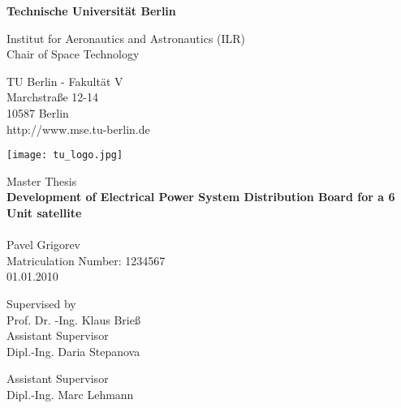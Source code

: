 \thispagestyle{empty}
\begin{center}

\vspace{1.0cm}
{\LARGE \textbf{Technische Universität Berlin}}

\vspace{0.5cm}

{\large Institut for Aeronautics and Astronautics (ILR)\\[1mm]}
{\large Chair of Space Technology\\[5mm]}

TU Berlin - Fakultät V\\
Marchstraße 12-14\\
10587 Berlin\\
http://www.mse.tu-berlin.de\\

\vspace*{1cm}

\texttt{[image: tu\_logo.jpg]}

\vspace*{1.0cm}

{\LARGE Master Thesis}\\

\vspace{1.0cm}
{\LARGE \textbf{Development of  Electrical Power System Distribution Board for a 6 Unit satellite}}\\
\vspace*{0.3cm}
{\LARGE \textbf{}}\\
\vspace*{1.0cm}
{\LARGE Pavel Grigorev}
\\
\vspace*{0.5cm}
Matriculation Number: 1234567\\
01.01.2010\\ %
\vspace*{1.0cm}

Supervised by\\
Prof. Dr. -Ing. Klaus Brieß\\
\vspace*{0.5cm}
Assistant Supervisor\\
Dipl.-Ing. Daria Stepanova

\vspace*{0.5cm}
Assistant Supervisor\\
Dipl.-Ing. Marc Lehmann
\vspace{3cm}


\end{center}

